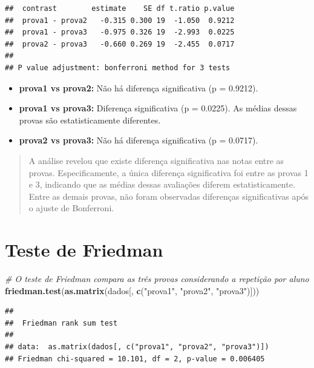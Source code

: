 \documentclass[
]{book}
\newenvironment{Shaded}{\begin{snugshade}}{\end{snugshade}}
\newcommand{\CommentTok}[1]{\textcolor[rgb]{0.56,0.35,0.01}{\textit{#1}}}
\newcommand{\FunctionTok}[1]{\textcolor[rgb]{0.13,0.29,0.53}{\textbf{#1}}}
\newcommand{\NormalTok}[1]{#1}
\newcommand{\StringTok}[1]{\textcolor[rgb]{0.31,0.60,0.02}{#1}}
\providecommand{\tightlist}{%
  \setlength{\itemsep}{0pt}\setlength{\parskip}{0pt}}
\begin{document}
\begin{verbatim}
##  contrast        estimate    SE df t.ratio p.value
##  prova1 - prova2   -0.315 0.300 19  -1.050  0.9212
##  prova1 - prova3   -0.975 0.326 19  -2.993  0.0225
##  prova2 - prova3   -0.660 0.269 19  -2.455  0.0717
## 
## P value adjustment: bonferroni method for 3 tests
\end{verbatim}

\begin{itemize}
\tightlist
\item
  \textbf{prova1 vs prova2:} Não há diferença significativa (p = 0.9212).
\item
  \textbf{prova1 vs prova3:} Diferença significativa (p = 0.0225). As médias dessas provas são estatisticamente diferentes.
\item
  \textbf{prova2 vs prova3:} Não há diferença significativa (p = 0.0717).
\end{itemize}

\begin{quote}
A análise revelou que existe diferença significativa nas notas entre as provas. Especificamente, a única diferença significativa foi entre as provas 1 e 3, indicando que as médias dessas avaliações diferem estatisticamente. Entre as demais provas, não foram observadas diferenças significativas após o ajuste de Bonferroni.
\end{quote}

\section{Teste de Friedman}\label{teste-de-friedman}

\begin{Shaded}
\begin{Highlighting}[]
\CommentTok{\# O teste de Friedman compara as três provas considerando a repetição por aluno}
\FunctionTok{friedman.test}\NormalTok{(}\FunctionTok{as.matrix}\NormalTok{(dados[, }\FunctionTok{c}\NormalTok{(}\StringTok{"prova1"}\NormalTok{, }\StringTok{"prova2"}\NormalTok{, }\StringTok{"prova3"}\NormalTok{)]))}
\end{Highlighting}
\end{Shaded}

\begin{verbatim}
## 
##  Friedman rank sum test
## 
## data:  as.matrix(dados[, c("prova1", "prova2", "prova3")])
## Friedman chi-squared = 10.101, df = 2, p-value = 0.006405
\end{verbatim}
\end{document}
